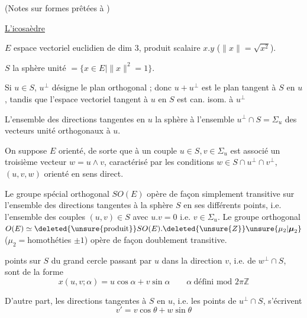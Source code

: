 
(Notes sur formes  prêtées à )

\uline{L'icosaèdre}

$E$ espace vectoriel euclidien de dim $3$, produit scalaire $x.y$ ($\|x\|=\sqrt{x^2}$).

$S$ la sphère unité $=\{x\in E\mid\|x\|^2=1\}$.

Si $u\in S$, $u^\perp$ désigne le plan orthogonal ; donc $u+u^\perp$ est le plan tangent à $S$ en $u$, tandis que l'espace vectoriel tangent à $u$ en $S$ est can. isom. à $u^\perp$

L'ensemble des directions tangentes en $u$   la sphère   à l'ensemble $u^\perp\cap S=\Sigma_u$ des vecteurs unité orthogonaux à $u$.

On suppose $E$ orienté, de sorte que  à un couple $u\in S,v\in\Sigma_u$ est associé un troisième vecteur $w=u\wedge v$, caractérisé par les conditions $w\in S\cap u^\perp\cap v^\perp$, $(u,v,w)$ orienté en sens direct.

Le groupe spécial orthogonal $SO(E)$ opère de façon simplement transitive sur l'ensemble des directions tangentes à la sphère $S$ en ses différents points, i.e. l'ensemble des couples $(u,v)\in S$ avec $u.v=0$ i.e. $v\in\Sigma_u$. Le groupe orthogonal $O(E)\simeq\deleted{\text{\unsure{produit}}}SO(E).\deleted{\unsure{Z}}\unsure{\mu_2|\boldsymbol{\mu}_2}$ ($\mu_2={}$homothéties $\pm1$) opère de façon doublement transitive.

  points sur $S$ du grand cercle passant par $u$ dans la direction $v$,  i.e. de $w^\perp\cap S$, sont de la forme
\[
x(u,v;\alpha)=u\cos\alpha+v\sin\alpha \qquad \alpha\ \text{défini mod }2\pi\mathbb Z
\]

D'autre part, les  directions tangentes à $S$ en $u$, i.e. les  points de $u^\perp\cap S$, s'écrivent
\[
v'=v\cos\theta+w\sin\theta
\]

